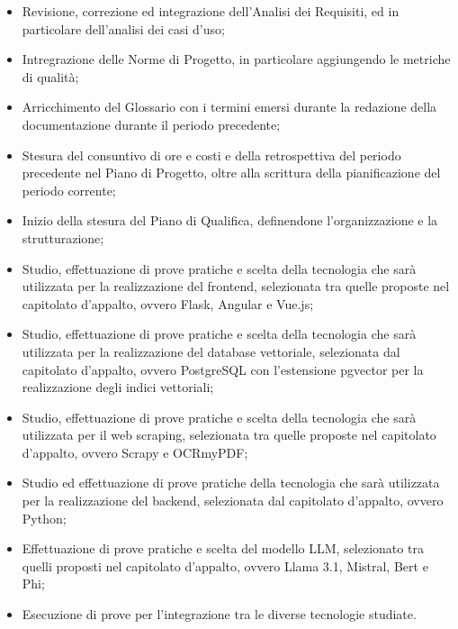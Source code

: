\begin{itemize}
    \item Revisione, correzione ed integrazione dell'Analisi dei Requisiti, ed in particolare dell'analisi dei casi d'uso;
    \item Intregrazione delle Norme di Progetto, in particolare aggiungendo le metriche di qualità;
    \item Arricchimento del Glossario con i termini emersi durante la redazione della documentazione durante il periodo precedente;
    \item Stesura del consuntivo di ore e costi e della retrospettiva del periodo precedente nel Piano di Progetto, oltre alla scrittura della pianificazione del periodo corrente;
    \item Inizio della stesura del Piano di Qualifica, definendone l'organizzazione e la strutturazione;
    \item Studio, effettuazione di prove pratiche e scelta della tecnologia che sarà utilizzata per la realizzazione del frontend, selezionata tra quelle proposte nel capitolato d'appalto, ovvero Flask, Angular e Vue.js;
    \item Studio, effettuazione di prove pratiche e scelta della tecnologia che sarà utilizzata per la realizzazione del database vettoriale, selezionata dal capitolato d'appalto, ovvero PostgreSQL con l'estensione pgvector per la realizzazione degli indici vettoriali;
    \item Studio, effettuazione di prove pratiche e scelta della tecnologia che sarà utilizzata per il web scraping, selezionata tra quelle proposte nel capitolato d'appalto, ovvero Scrapy e OCRmyPDF;
    \item Studio ed effettuazione di prove pratiche della tecnologia che sarà utilizzata per la realizzazione del backend, selezionata dal capitolato d'appalto, ovvero Python;
    \item Effettuazione di prove pratiche e scelta del modello LLM, selezionato tra quelli proposti nel capitolato d'appalto, ovvero Llama 3.1, Mistral, Bert e Phi;
    \item Esecuzione di prove per l'integrazione tra le diverse tecnologie studiate.
\end{itemize}
